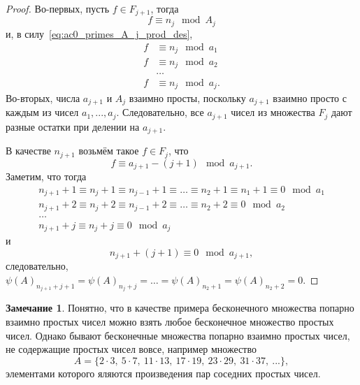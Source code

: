 \documentclass[a4paper,openbib]{article}
\theoremstyle{definition}
\newtheorem{remark}[lemma]{Замечание}
\begin{document}
\begin{proof}
	Во-первых, пусть $f \in F_{j+1}$,
	тогда
	\begin{equation}
		f \equiv n_j \mod A_j
	\end{equation}
	и, в силу~\eqref{eq:ac0_primes_A_j_prod_des},
	\begin{equation}
		\begin{array}{rl}
		f &\equiv n_j \mod a_1
		\\
		f &\equiv n_j \mod a_2
		\\
		&\dots
		\\
		f &\equiv n_j \mod a_j
		.
		\end{array}
	\end{equation}
	Во-вторых, числа $a_{j+1}$ и $A_j$ взаимно просты, поскольку $a_{j+1}$ взаимно просто с каждым из чисел $a_1,...,a_j$.
	Следовательно, все $a_{j+1}$ чисел из множества $F_j$ дают разные остатки при делении на $a_{j+1}$.

	В качестве $n_{j+1}$ возьмём такое $f\in F_j$, что
	\begin{equation}
		f \equiv a_{j+1} - (j+1) \mod a_{j+1}
		.
	\end{equation}
	Заметим, что тогда
	\begin{equation}
		\begin{array}{l}
			n_{j+1} + 1 \equiv n_j + 1 \equiv n_{j-1} + 1 \equiv \dots \equiv n_2 + 1 \equiv n_1 + 1 \equiv 0 \mod a_1
			\\
			n_{j+1} + 2 \equiv n_j + 2 \equiv n_{j-1} + 2 \equiv \dots \equiv n_2 + 2 \equiv 0 \mod a_2
			\\
			\dots
			\\
			n_{j+1} + j \equiv n_j + j  \equiv 0 \mod a_j
		\end{array}
	\end{equation}
	и
	\begin{equation}
		n_{j+1} + (j+1) \equiv 0 \mod a_{j+1}
		,
	\end{equation}
	следовательно,
	$\psi(A)_{n_{j+1} + j+1} = \psi(A)_{n_{j} + j} = \dots = \psi(A)_{n_2 + 1} = \psi(A)_{n_2 + 2} = 0$.


\end{proof}

\begin{remark}
	Понятно, что в качестве примера бесконечного множества
	попарно взаимно простых чисел можно взять любое бесконечное множество простых чисел.
	Однако бывают бесконечные множества попарно взаимно простых чисел,
	не содержащие простых чисел вовсе, например множество
	\begin{equation}
		A = \{ 2\cdot 3,~5 \cdot 7,~11 \cdot 13,~17\cdot 19,~23\cdot29,~31\cdot 37,~...\},
	\end{equation}
	элементами которого яляются произведения пар соседних простых чисел.
\end{remark}
\end{document}
